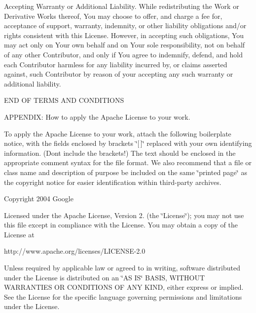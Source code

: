 \begin{DoxyEnumerate}
\item Accepting Warranty or Additional Liability. While redistributing the Work or Derivative Works thereof, You may choose to offer, and charge a fee for, acceptance of support, warranty, indemnity, or other liability obligations and/or rights consistent with this License. However, in accepting such obligations, You may act only on Your own behalf and on Your sole responsibility, not on behalf of any other Contributor, and only if You agree to indemnify, defend, and hold each Contributor harmless for any liability incurred by, or claims asserted against, such Contributor by reason of your accepting any such warranty or additional liability.
\end{DoxyEnumerate}

E\+ND OF T\+E\+R\+MS A\+ND C\+O\+N\+D\+I\+T\+I\+O\+NS

A\+P\+P\+E\+N\+D\+IX\+: How to apply the Apache License to your work.

To apply the Apache License to your work, attach the following boilerplate notice, with the fields enclosed by brackets \char`\"{}\mbox{[}$\,$\mbox{]}\char`\"{} replaced with your own identifying information. (Don\textquotesingle{}t include the brackets!) The text should be enclosed in the appropriate comment syntax for the file format. We also recommend that a file or class name and description of purpose be included on the same \char`\"{}printed page\char`\"{} as the copyright notice for easier identification within third-\/party archives.

Copyright 2004 Google

Licensed under the Apache License, Version 2. (the \char`\"{}\+License\char`\"{}); you may not use this file except in compliance with the License. You may obtain a copy of the License at \begin{DoxyVerb}http://www.apache.org/licenses/LICENSE-2.0
\end{DoxyVerb}


Unless required by applicable law or agreed to in writing, software distributed under the License is distributed on an \char`\"{}\+A\+S I\+S\char`\"{} B\+A\+S\+IS, W\+I\+T\+H\+O\+UT W\+A\+R\+R\+A\+N\+T\+I\+ES OR C\+O\+N\+D\+I\+T\+I\+O\+NS OF A\+NY K\+I\+ND, either express or implied. See the License for the specific language governing permissions and limitations under the License. 
